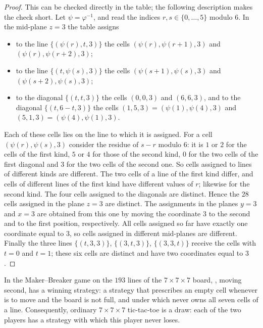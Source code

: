 \begin{proof}
This can be checked directly in the table; the following description makes the check short. Let
$\psi=\varphi^{-1}$, and read the indices $r,s\in\{0,\dots,5\}$ modulo $6$. In the mid-plane $z=3$ the
table assigns
\begin{itemize}
\item to the line $\{(\psi(r),t,3)\}$ the cells $(\psi(r),\psi(r+1),3)$ and $(\psi(r),\psi(r+2),3)$;
\item to the line $\{(t,\psi(s),3)\}$ the cells $(\psi(s+1),\psi(s),3)$ and $(\psi(s+2),\psi(s),3)$;
\item to the diagonal $\{(t,t,3)\}$ the cells $(0,0,3)$ and $(6,6,3)$, and to the diagonal
      $\{(t,6-t,3)\}$ the cells $(1,5,3)=(\psi(1),\psi(4),3)$ and $(5,1,3)=(\psi(4),\psi(1),3)$.
\end{itemize}
Each of these cells lies on the line to which it is assigned. For a cell $(\psi(r),\psi(s),3)$ consider
the residue of $s-r$ modulo $6$: it is $1$ or $2$ for the cells of the first kind, $5$ or $4$ for those
of the second kind, $0$ for the two cells of the first diagonal and $3$ for the two cells of the second
one. So cells assigned to lines of different kinds are different. The two cells of a line of the first
kind differ, and cells of different lines of the first kind have different values of $r$; likewise for
the second kind. The four cells assigned to the diagonals are distinct. Hence the $28$ cells assigned
in the plane $z=3$ are distinct. The assignments in the planes $y=3$ and $x=3$ are obtained from this
one by moving the coordinate $3$ to the second and to the first position, respectively. All cells
assigned so far have exactly one coordinate equal to $3$, so cells assigned in different mid-planes are
different. Finally the three lines $\{(t,3,3)\}$, $\{(3,t,3)\}$, $\{(3,3,t)\}$ receive the cells with
$t=0$ and $t=1$; these six cells are distinct and have two coordinates equal to $3$.
\end{proof}

\begin{corollary}\label{cor:seven}
In the Maker--Breaker game on the $193$ lines of the $7\times7\times7$ board, \Breaker, moving second,
has a winning strategy: a strategy that prescribes an empty cell whenever \Breaker{} is to move and the
board is not full, and under which \Maker{} never owns all seven cells of a line. Consequently, ordinary
$7\times7\times7$ tic-tac-toe is a draw: each of the two players has a strategy with which this player
never loses.
\end{corollary}

